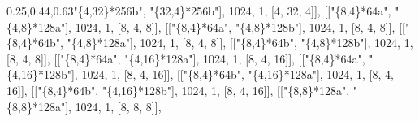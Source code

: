 \documentclass[
  10pt,
  letterpaper,
]{article}
\newenvironment{Shaded}{}{}
\newcommand{\FloatTok}[1]{\textcolor[rgb]{0.25,0.63,0.44}{#1}}
\newcommand{\NormalTok}[1]{#1}
\newcommand{\OperatorTok}[1]{\textcolor[rgb]{0.40,0.40,0.40}{#1}}
\newcommand{\StringTok}[1]{\textcolor[rgb]{0.25,0.44,0.63}{#1}}
\begin{document}
\begin{Shaded}
\begin{Highlighting}[]
\NormalTok{[[}\StringTok{"\{4,32\}*256b"}\OperatorTok{,} \StringTok{"\{32,4\}*256b"}\NormalTok{]}\OperatorTok{,} \FloatTok{1024}\OperatorTok{,} \FloatTok{1}\OperatorTok{,}\NormalTok{ [}\FloatTok{4}\OperatorTok{,} \FloatTok{32}\OperatorTok{,} \FloatTok{4}\NormalTok{]]}\OperatorTok{,}
\NormalTok{[[}\StringTok{"\{8,4\}*64a"}\OperatorTok{,} \StringTok{"\{4,8\}*128a"}\NormalTok{]}\OperatorTok{,} \FloatTok{1024}\OperatorTok{,} \FloatTok{1}\OperatorTok{,}\NormalTok{ [}\FloatTok{8}\OperatorTok{,} \FloatTok{4}\OperatorTok{,} \FloatTok{8}\NormalTok{]]}\OperatorTok{,}
\NormalTok{[[}\StringTok{"\{8,4\}*64a"}\OperatorTok{,} \StringTok{"\{4,8\}*128b"}\NormalTok{]}\OperatorTok{,} \FloatTok{1024}\OperatorTok{,} \FloatTok{1}\OperatorTok{,}\NormalTok{ [}\FloatTok{8}\OperatorTok{,} \FloatTok{4}\OperatorTok{,} \FloatTok{8}\NormalTok{]]}\OperatorTok{,}
\NormalTok{[[}\StringTok{"\{8,4\}*64b"}\OperatorTok{,} \StringTok{"\{4,8\}*128a"}\NormalTok{]}\OperatorTok{,} \FloatTok{1024}\OperatorTok{,} \FloatTok{1}\OperatorTok{,}\NormalTok{ [}\FloatTok{8}\OperatorTok{,} \FloatTok{4}\OperatorTok{,} \FloatTok{8}\NormalTok{]]}\OperatorTok{,}
\NormalTok{[[}\StringTok{"\{8,4\}*64b"}\OperatorTok{,} \StringTok{"\{4,8\}*128b"}\NormalTok{]}\OperatorTok{,} \FloatTok{1024}\OperatorTok{,} \FloatTok{1}\OperatorTok{,}\NormalTok{ [}\FloatTok{8}\OperatorTok{,} \FloatTok{4}\OperatorTok{,} \FloatTok{8}\NormalTok{]]}\OperatorTok{,}
\NormalTok{[[}\StringTok{"\{8,4\}*64a"}\OperatorTok{,} \StringTok{"\{4,16\}*128a"}\NormalTok{]}\OperatorTok{,} \FloatTok{1024}\OperatorTok{,} \FloatTok{1}\OperatorTok{,}\NormalTok{ [}\FloatTok{8}\OperatorTok{,} \FloatTok{4}\OperatorTok{,} \FloatTok{16}\NormalTok{]]}\OperatorTok{,}
\NormalTok{[[}\StringTok{"\{8,4\}*64a"}\OperatorTok{,} \StringTok{"\{4,16\}*128b"}\NormalTok{]}\OperatorTok{,} \FloatTok{1024}\OperatorTok{,} \FloatTok{1}\OperatorTok{,}\NormalTok{ [}\FloatTok{8}\OperatorTok{,} \FloatTok{4}\OperatorTok{,} \FloatTok{16}\NormalTok{]]}\OperatorTok{,}
\NormalTok{[[}\StringTok{"\{8,4\}*64b"}\OperatorTok{,} \StringTok{"\{4,16\}*128a"}\NormalTok{]}\OperatorTok{,} \FloatTok{1024}\OperatorTok{,} \FloatTok{1}\OperatorTok{,}\NormalTok{ [}\FloatTok{8}\OperatorTok{,} \FloatTok{4}\OperatorTok{,} \FloatTok{16}\NormalTok{]]}\OperatorTok{,}
\NormalTok{[[}\StringTok{"\{8,4\}*64b"}\OperatorTok{,} \StringTok{"\{4,16\}*128b"}\NormalTok{]}\OperatorTok{,} \FloatTok{1024}\OperatorTok{,} \FloatTok{1}\OperatorTok{,}\NormalTok{ [}\FloatTok{8}\OperatorTok{,} \FloatTok{4}\OperatorTok{,} \FloatTok{16}\NormalTok{]]}\OperatorTok{,}
\NormalTok{[[}\StringTok{"\{8,8\}*128a"}\OperatorTok{,} \StringTok{"\{8,8\}*128a"}\NormalTok{]}\OperatorTok{,} \FloatTok{1024}\OperatorTok{,} \FloatTok{1}\OperatorTok{,}\NormalTok{ [}\FloatTok{8}\OperatorTok{,} \FloatTok{8}\OperatorTok{,} \FloatTok{8}\NormalTok{]]}\OperatorTok{,}

\end{Highlighting}
\end{Shaded}
\end{document}
